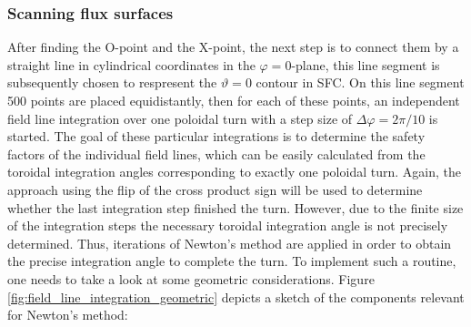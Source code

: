 \documentclass[./main.tex]{subfiles}
\begin{document}
\subsubsection{Scanning flux surfaces}
After finding the O-point and the X-point, the next step is to connect them by a straight line in cylindrical coordinates in the $\varphi=0$-plane, this line segment is subsequently chosen to respresent the $\vartheta=0$ contour in SFC. On this line segment 500 points are placed equidistantly, then for each of these points, an independent field line integration over one poloidal turn with a step size of $\Delta\varphi=2\pi/10$ is started. The goal of these particular integrations is to determine the safety factors of the individual field lines, which can be easily calculated from the toroidal integration angles corresponding to exactly one poloidal turn. Again, the approach using the flip of the cross product sign will be used to determine whether the last integration step finished the turn. However, due to the finite size of the integration steps the necessary toroidal integration angle is not precisely determined. Thus, iterations of Newton's method are applied in order to obtain the precise integration angle to complete the turn. To implement such a routine, one needs to take a look at some geometric considerations. Figure \ref{fig:field_line_integration_geometric} depicts a sketch of the components relevant for Newton's method:
\end{document}
